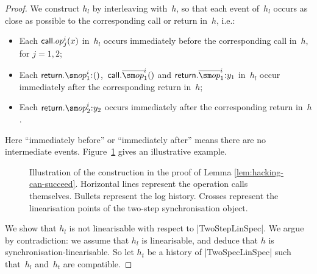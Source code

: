 \begin{proof}
We construct $h_l$ by interleaving with~$h$, so that each event of~$h_l$
occurs as close as possible to the corresponding call or return in~$h$, i.e.:
%
\begin{itemize}
\item Each $\mathsf{call}.op_j^{i}(x)$ in~$h_l$ occurs immediately before the
  corresponding call in~$h$, for $j = 1,2$;

\item Each $\return.\op_1^i \:: ()$,\, $\call.\overline{\op}_1^i()$ and
  $\return.\overline{\op}_1^i \:: y_1$ in~$h_l$ occur immediately after the
  corresponding return in~$h$;

\item Each $\return.\op_2^i \:: y_2$ occurs immediately after the
  corresponding return in~$h$.
\end{itemize}
%
Here ``immediately before'' or ``immediately after'' means there are no
intermediate events.  Figure~\ref{fig:hacking-can-succeed} gives an
illustrative example. 


\begin{figure}[tp]
\begin{center}
\end{center}
\caption{Illustration of the construction in the proof of Lemma
  \ref{lem:hacking-can-succeed}.  Horizontal lines represent the operation
  calls themselves.  Bullets represent the log history.  Crosses represent
  the linearisation points of the two-step synchronisation object.}
\label{fig:hacking-can-succeed}
\end{figure}

We show that $h_l$ is not linearisable with respect to |TwoStepLinSpec|.  We
argue by contradiction: we assume that $h_l$ is linearisable, and deduce that
$h$ is synchronisation-linearisable.  So let $h_t$ be a history of
|TwoSpecLinSpec| such that~$h_l$ and~$h_t$ are compatible.  


\end{proof}
